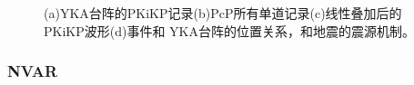 \begin{figure}[!ht]
{}
	\hspace{3em}
	\caption{(a)YKA台阵的PKiKP记录(b)PcP所有单道记录(c)线性叠加后的PKiKP波形(d)事件和%
YKA台阵的位置关系，和地震的震源机制。}
	\label{yka}
\end{figure}

\newpage

\subsubsection{NVAR}

